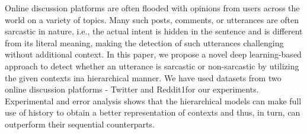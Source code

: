 Online discussion platforms are often flooded with opinions from users across the world on a variety of topics. Many such posts, comments, or utterances are often sarcastic in nature, i.e., the actual intent is hidden in the sentence and is different from its literal meaning,  making the detection of such utterances challenging without additional context.  In this paper,  we propose a novel deep learning-based approach to detect whether an utterance is sarcastic or non-sarcastic by utilizing the given contexts ina hierarchical manner.  We have used datasets from two online discussion platforms  -  Twitter and Reddit1for our experiments.   Experimental and error analysis shows that the hierarchical models can make full use of history to obtain a better representation of contexts and thus,  in turn,  can outperform their sequential counterparts.
